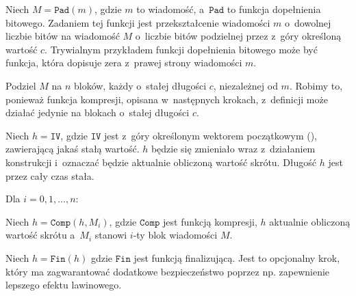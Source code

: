 \documentclass[12pt,a4paper,twoside]{article}
\begin{document}
\begin{myenumerate}

    \item Niech $M = \mathtt{Pad}(m)$, gdzie $m$ to wiadomość, a~$\mathtt{Pad}$
    to funkcja dopełnienia bitowego. Zadaniem tej funkcji jest przekształcenie
    wiadomości $m$ o~dowolnej liczbie bitów na wiadomość $M$ o~liczbie bitów
    podzielnej przez z~góry określoną wartość $c$. Trywialnym przykładem
    funkcji dopełnienia bitowego może być funkcja, która dopisuje zera z~prawej
    strony wiadomości $m$.

    \item Podziel $M$ na $n$ bloków, każdy o~stałej długości $c$, niezależnej
    od $m$. Robimy to, ponieważ funkcja kompresji, opisana w~następnych
    krokach, z~definicji może działać jedynie na blokach o~stałej długości $c$.

    \item Niech $h = \mathtt{IV}$, gdzie $\mathtt{IV}$ jest z~góry określonym
    wektorem początkowym (), zawierającą jakaś stałą
    wartość. $h$ będzie się zmieniało wraz z~działaniem konstrukcji i~oznaczać
    będzie aktualnie obliczoną wartość skrótu. Długość $h$ jest przez cały czas
    stała.

    \item Dla $i = 0, 1, \ldots, n$:

    \begin{myenumerate}

        \item Niech $h=\mathtt{Comp}(h,M_i)$, gdzie $\mathtt{Comp}$ jest
        funkcją kompresji, $h$ aktualnie obliczoną wartość skrótu a~$M_i$
        stanowi $i$-ty blok wiadomości $M$.

    \end{myenumerate}

    \item Niech $h=\mathtt{Fin}(h)$ gdzie $\mathtt{Fin}$ jest funkcją
    finalizującą. Jest to opcjonalny krok, który ma zagwarantować dodatkowe
    bezpieczeństwo poprzez np. zapewnienie lepszego efektu lawinowego.

\end{myenumerate}
\end{document}
